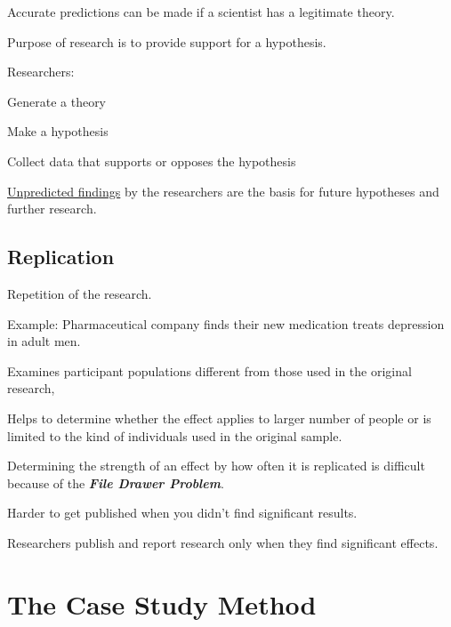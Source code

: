 \begin{coloredlist}
    \item Accurate predictions can be made if a scientist has a legitimate theory.
    \item Purpose of research is to provide support for a hypothesis.
    \item Researchers:
    \begin{coloredlist}
        \item Generate a theory
        \item Make a hypothesis
        \item Collect data that supports or opposes the hypothesis
    \end{coloredlist}
    \underline{Unpredicted findings} by the researchers are the basis for future hypotheses and further research. 
\end{coloredlist}

\subsection{Replication}

\begin{coloredlist}
    \item Repetition of the research.
    \begin{coloredlist}
        \item Example: Pharmaceutical company finds their new medication treats depression in adult men.
    \end{coloredlist}
    \item Examines participant populations different from those used in the original research,
    \item Helps to determine whether the effect applies to larger number of people or is limited to the kind of individuals used in the original sample.
    \item Determining the strength of an effect by how often it is replicated is difficult because of the \textbf{\textit{File Drawer Problem}}.
    \begin{coloredlist}
        \item Harder to get published when you didn't find significant results.
        \item Researchers publish and report research only when they find significant effects.
    \end{coloredlist}
\end{coloredlist}
\hypertarget{case study}{}
\section{The Case Study Method}


